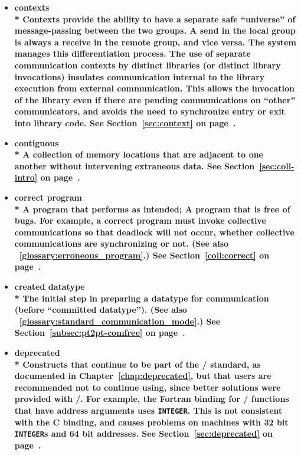 \begin{itemize}
\label{glossary:contexts}
\item \bf{ contexts} \\*
Contexts provide the ability to have
a separate safe ``universe''
of message-passing between the two groups.  A send in the local
group is always a receive in the remote group, and vice versa.
The system manages this differentiation process.
The use of separate communication
contexts by distinct libraries (or distinct library invocations)
insulates communication internal to the library execution from
external communication.  This allows the invocation of the library even if
there are pending communications
on ``other'' communicators, and avoids the need to
synchronize entry or exit into library 
code.
See Section~\ref{sec:context} on page~\pageref{sec:context}.

\label{glossary:contiguous}
\item \bf{ contiguous} \\*
A collection of memory locations that are adjacent to one another
without intervening extraneous data.
See Section~\ref{sec:coll-intro} on page~\pageref{sec:coll-intro}.

\label{glossary:correct_program}
\item \bf{ correct program} \\*
A program that performs as intended; A program that is free of bugs. 
For example, a  {\bf correct program} must invoke collective communications so
that deadlock will
not occur, whether collective communications are synchronizing or not.
(See also ~\ref{glossary:erroneous_program}.)
See Section~\ref{coll:correct} on page~\pageref{coll:correct}.

\label{glossary:created_datatype}
\item \bf{ created datatype} \\*
The initial step in preparing a datatype for communication (before ``committed datatype'').
(See also ~\ref{glossary:standard_communication_mode}.)
See Section~\ref{subsec:pt2pt-comfree} on page~\pageref{subsec:pt2pt-comfree}.

\label{glossary:deprecated}
\item \bf{ deprecated} \\*
Constructs that continue to be part of the \MPI/ standard, 
as documented in Chapter~\ref{chap:deprecated}, 
but that users are recommended not to continue using, since 
better solutions were provided with \MPIII/.
For example, the Fortran binding 
for \mpii/ functions that have address arguments uses {\tt INTEGER}.
This is not consistent with the C binding, and causes problems on
machines with 32 bit {\tt INTEGER}s and 64 bit addresses.
See Section~\ref{sec:deprecated} on page~\pageref{sec:deprecated}.


\end{itemize}

